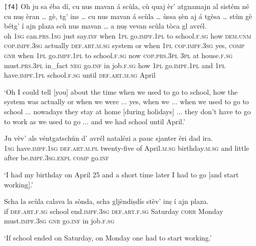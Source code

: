 \begin{linenumbers}
	\gll \texttt{[f4]} Oh ju sa éba dí, cu nus mavan á scùla, cù quaj èr’ atgnamajn al sistém né cu nuṣ èran … gè, tg’ ins … cu nus mavan á scùla …  ùssa ṣèn aj á tgèsa … stùn gè bétg’ í ajn plaza scù nus mavan … a nuṣ vevan scùla tòca gl avrél.   \\
	 {} oh \textsc{1sg} can.\textsc{prs.1sg} just say.\textsc{inf} when \textsc{1pl} go.\textsc{impf.1pl} to school.\textsc{f.sg} how \textsc{dem.unm} \textsc{cop.impf.3sg} actually \textsc{def.art.m.sg} system or when \textsc{1pl} \textsc{cop.impf.3sg} {} yes, \textsc{comp} \textsc{gnr} {} when \textsc{1pl} go.\textsc{impf.1pl} to school.\textsc{f.sg} {} now \textsc{cop.prs.3pl} \textsc{3pl} at house.\textsc{f.sg} {} must.\textsc{prs.3pl} in\_fact \textsc{neg} go.\textsc{inf} in job.\textsc{f.sg} how \textsc{1pl} go.\textsc{impf.1pl} {} and \textsc{1pl} have.\textsc{impf.1pl} school.\textsc{f.sg} until \textsc{def.art.m.sg} April\\
\end{linenumbers}
\medskip
\glt `Oh I could tell [you] about the time when we used to go to school, how the system was actually or when we were ... yes, when we ... when we used to go to school ... nowadays they stay at home [during holidays] ... they don't have to go to work as we used to go ... and we had school until April.'
\medskip

\begin{linenumbers}
	\gll Ju vèv’ als véntgatschún d’ avrél natalézi a pauc sjanter èri dad ira.   \\
	\textsc{1sg} have.\textsc{impf.1sg} \textsc{def.art.m.pl} twenty-five of April.\textsc{m.sg} birthday.\textsc{m.sg} and little after be.\textsc{impf.3sg.expl} \textsc{comp} go.\textsc{inf}\\
\end{linenumbers}
\medskip
\glt `I had my birthday on April 25 and a short time later I had to go [and start working].'
\medskip

\begin{linenumbers}
	\gll Scha la scùla calava la sònda, scha gljèndiṣdís stèv’ inṣ í ajn plaza.   \\
	if \textsc{def.art.f.sg} school end.\textsc{impf.3sg} \textsc{def.art.f.sg} Saturday \textsc{corr} Monday must.\textsc{impf.3sg} \textsc{gnr} go.\textsc{inf} in job.\textsc{f.sg}\\
\end{linenumbers}
\medskip
\glt `If school ended on Saturday, on Monday one had to start working.'
\medskip

